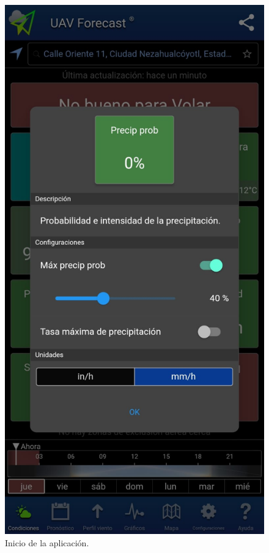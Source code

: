 \begin{figure}[htbp]
\begin{minipage}[b]{0.3\textwidth}
		\caption*{Inicio de la aplicación.}
	\end{minipage}
	\hspace{0.02\textwidth} %
	\begin{minipage}[b]{0.3\textwidth}
		\centering
		\includegraphics[width=\textwidth]{imagenes/app2}

\end{minipage}
\end{figure}
